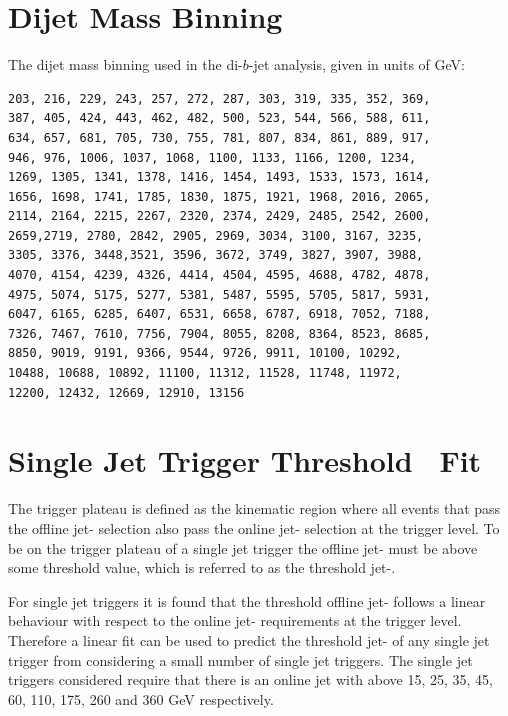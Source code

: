 
\appendix

\clearpage
{}
{}
\chapter{Dijet Mass Binning}
\label{app:dijet_bins}

\noindent
The dijet mass binning used in the di-$b$-jet analysis, given in units of GeV:
\begin{verbatim}
203, 216, 229, 243, 257, 272, 287, 303, 319, 335, 352, 369,
387, 405, 424, 443, 462, 482, 500, 523, 544, 566, 588, 611, 
634, 657, 681, 705, 730, 755, 781, 807, 834, 861, 889, 917,
946, 976, 1006, 1037, 1068, 1100, 1133, 1166, 1200, 1234, 
1269, 1305, 1341, 1378, 1416, 1454, 1493, 1533, 1573, 1614,
1656, 1698, 1741, 1785, 1830, 1875, 1921, 1968, 2016, 2065, 
2114, 2164, 2215, 2267, 2320, 2374, 2429, 2485, 2542, 2600, 
2659,2719, 2780, 2842, 2905, 2969, 3034, 3100, 3167, 3235, 
3305, 3376, 3448,3521, 3596, 3672, 3749, 3827, 3907, 3988, 
4070, 4154, 4239, 4326, 4414, 4504, 4595, 4688, 4782, 4878, 
4975, 5074, 5175, 5277, 5381, 5487, 5595, 5705, 5817, 5931, 
6047, 6165, 6285, 6407, 6531, 6658, 6787, 6918, 7052, 7188, 
7326, 7467, 7610, 7756, 7904, 8055, 8208, 8364, 8523, 8685, 
8850, 9019, 9191, 9366, 9544, 9726, 9911, 10100, 10292, 
10488, 10688, 10892, 11100, 11312, 11528, 11748, 11972, 
12200, 12432, 12669, 12910, 13156
\end{verbatim}


\chapter{Single Jet Trigger Threshold~\pT{} Fit}
\label{app:triggerTurnOn_fit}

The trigger plateau is defined as the kinematic region where all events that pass the offline jet-\pT{} selection
also pass the online jet-\pT{} selection at the trigger level.
To be on the trigger plateau of a single jet trigger
the offline jet-\pT{} must be above some threshold value,
which is referred to as the threshold jet-\pT{}.

For single jet triggers it is found that the threshold offline jet-\pT{} follows
a linear behaviour with respect to the online jet-\pT{} requirements at the trigger level.
Therefore a linear fit can be used to predict the threshold jet-\pT{} of any single jet trigger
from considering a small number of single jet triggers.
The single jet triggers considered require that there is an online jet with \pT{} above
15, 25, 35, 45, 60, 110, 175, 260 and 360 GeV respectively.

